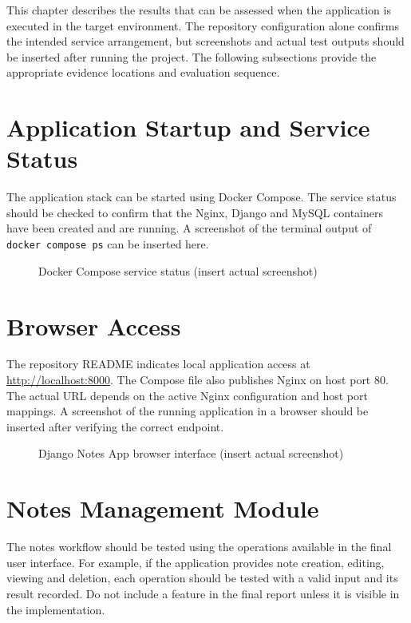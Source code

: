 \documentclass[12pt,a4paper,oneside]{report}
\begin{document}
This chapter describes the results that can be assessed when the application is executed in the target environment. The repository configuration alone confirms the intended service arrangement, but screenshots and actual test outputs should be inserted after running the project. The following subsections provide the appropriate evidence locations and evaluation sequence.

\section{Application Startup and Service Status}
The application stack can be started using Docker Compose. The service status should be checked to confirm that the Nginx, Django and MySQL containers have been created and are running. A screenshot of the terminal output of \texttt{docker compose ps} can be inserted here.

\begin{figure}[H]
\centering
{}
\caption{Docker Compose service status (insert actual screenshot)}
\label{fig:compose-result}
\end{figure}

\section{Browser Access}
The repository README indicates local application access at \url{http://localhost:8000}. The Compose file also publishes Nginx on host port 80. The actual URL depends on the active Nginx configuration and host port mappings. A screenshot of the running application in a browser should be inserted after verifying the correct endpoint.

\begin{figure}[H]
\centering
{}
\caption{Django Notes App browser interface (insert actual screenshot)}
\label{fig:browser}
\end{figure}

\section{Notes Management Module}
The notes workflow should be tested using the operations available in the final user interface. For example, if the application provides note creation, editing, viewing and deletion, each operation should be tested with a valid input and its result recorded. Do not include a feature in the final report unless it is visible in the implementation.
\end{document}
